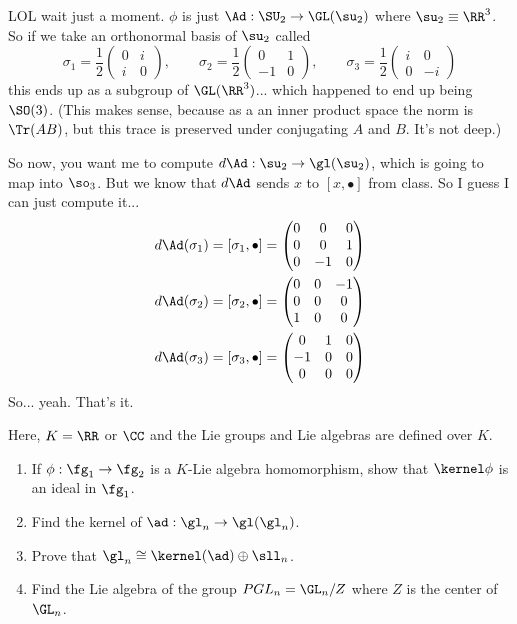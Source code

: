 \documentclass[11pt, headheight=30pt]{scrartcl}
\begin{document}
LOL wait just a moment. $\phi$ is just $\Ad: \SU_2\to \GL(\su_2)$ where
$\su_2\equiv \RR^3$. So if we take an orthonormal basis of $\su_2$ called
\[
    \sigma_1 = \frac12 \begin{pmatrix}
        0 & i \\
        i & 0
    \end{pmatrix},\qquad
    \sigma_2 = \frac12 \begin{pmatrix}
        0 & 1 \\
        -1 & 0
    \end{pmatrix},\qquad
    \sigma_3 = \frac12 \begin{pmatrix}
        i & 0 \\
        0 & -i
    \end{pmatrix}      
\]
this ends up as a subgroup of $\GL(\RR^3)$...
which happened to end up being $\SO(3)$. (This makes sense, because
as a an inner product space the norm is $\Tr(AB)$, but this trace
is preserved under conjugating $A$ and $B$. It's not deep.)

So now, you want me to compute $d \Ad: \su_2\to \gl(\su_2)$, which is going
to map into $\so_3$. But we know that $d \Ad$ sends $x$ to $[x, \bullet]$
from class. So I guess I can just compute it...
\begin{align*}
    d \Ad(\sigma_1) = [\sigma_1, \bullet] = \begin{pmatrix}
        0 & 0 & 0 \\
        0 & 0 & 1 \\
        0 & -1 & 0
    \end{pmatrix} \\
    d \Ad(\sigma_2) = [\sigma_2, \bullet] = \begin{pmatrix}
        0 & 0 & -1 \\
        0 & 0 & 0 \\
        1 & 0 & 0
    \end{pmatrix} \\
    d \Ad(\sigma_3) = [\sigma_3, \bullet] = \begin{pmatrix}
        0 & 1 & 0 \\
        -1 & 0 & 0 \\
        0 & 0 & 0
    \end{pmatrix}
\end{align*}
So... yeah. That's it.

\pagebreak
\begin{prob*}
    Here, $K=\RR$ or $\CC$ and the Lie groups and Lie algebras are defined over $K$.
    \begin{enumerate}
        \item If $\phi:\fg_1\to\fg_2$ is a $K$-Lie algebra homomorphism, show that
            $\kernel\phi$ is an ideal in $\fg_1$.
        \item Find the kernel of $\ad:\gl_n\to\gl(\gl_n)$.
        \item Prove that $\gl_n\cong\kernel(\ad) \oplus\sll_n$.
        \item Find the Lie algebra of the group $PGL_n=\GL_n/Z$ where $Z$ is the center
            of $\GL_n$.
    \end{enumerate}
\end{prob*}
\end{document}
